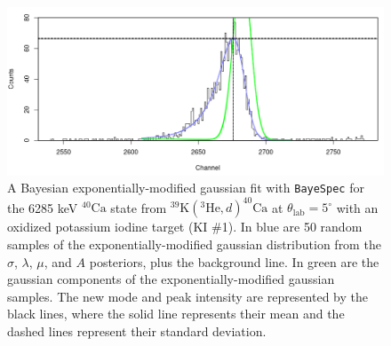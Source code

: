 \begin{figure}[t]
\centering
\includegraphics[width=6.5in]{Chapter-6/figs/ExpModGauss_Mode_and_Intensity.png}
\caption{\label{fig:EMG_Mode}A Bayesian exponentially-modified gaussian fit with \texttt{BayeSpec} for the 6285 keV $^{40}\mathrm{Ca}$ state from $^{39}\mathrm{K}(^{3}\mathrm{He},d)^{40}\mathrm{Ca}$ at $\theta_{\mathrm{lab}} = 5^{\circ}$ with an oxidized potassium iodine target (KI $\#$1). In blue are 50 random samples of the exponentially-modified gaussian distribution from the $\sigma$, $\lambda$, $\mu$, and $A$ posteriors, plus the background line. In green are the gaussian components of the exponentially-modified gaussian samples. The new mode and peak intensity are represented by the black lines, where the solid line represents their mean and the dashed lines represent their standard deviation.}
\end{figure}

